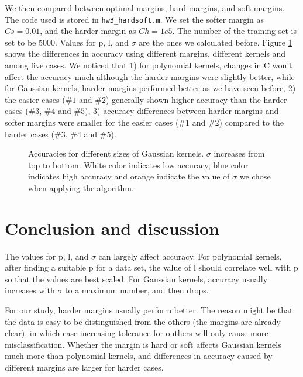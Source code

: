 \documentclass[UTF8,12pt]{article}
\begin{document}
	We then compared between optimal margins, hard margins, and soft margins. The code used is stored in \texttt{hw3\_hardsoft.m}. We set the softer margin as $Cs = 0.01$, and the harder margin as $Ch = 1e5$. The number of the training set is set to be 5000. Values for p, l, and $\sigma$ are the ones we calculated before. Figure \ref{fig:hardsoft} shows the differences in accuracy using different margins, different kernels and among five cases. We noticed that 1) for polynomial kernels, changes in C won't affect the accuracy much although the harder margins were slightly better, while for Gaussian kernels, harder margins performed better as we have seen before, 2) the easier cases ($\#1$ and $\#2$) generally shown higher accuracy than the harder cases ($\#3$, $\#4$ and $\#5$), 3) accuracy differences between harder margins and softer margins were smaller for the easier cases ($\#1$ and $\#2$) compared to the harder cases ($\#3$, $\#4$ and $\#5$).
	\begin{figure}[!ht]
		\centering
		\caption{\label{fig:hardsoft}Accuracies for different sizes of Gaussian kernels. $\sigma$ increases from top to bottom. White color indicates low accuracy, blue color indicates high accuracy and orange indicate the value of $\sigma$ we chose when applying the algorithm.}
	\end{figure}
	\section{Conclusion and discussion}
	The values for p, l, and $\sigma$ can largely affect accuracy. For polynomial kernels, after finding a suitable p for a data set, the value of l should correlate well with p so that the values are best scaled. For Gaussian kernels, accuracy usually increases with $\sigma$ to a maximum number, and then drops.
	
	For our study, harder margins usually perform better. The reason might be that the data is easy to be distinguished from the others (the margins are already clear), in which case increasing tolerance for outliers will only cause more misclassification. Whether the margin is hard or soft affects Gaussian kernels much more than polynomial kernels, and differences in accuracy caused by different margins are larger for harder cases.
	
\end{document}
